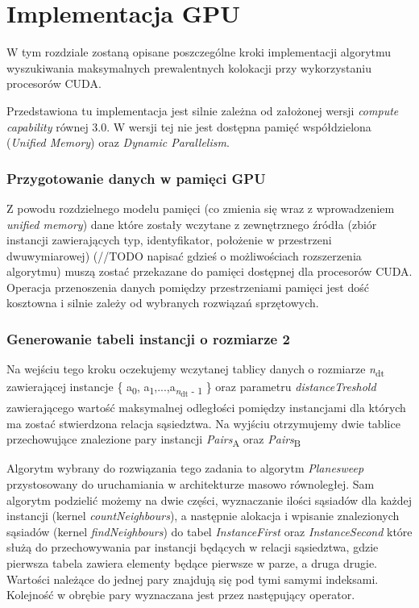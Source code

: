 \documentclass[12pt]{article}
\newcounter{operator}
\newcounter{algorytm}
\begin{document}
\section{Implementacja GPU}
\label{sec:gpu}
W tym rozdziale zostaną opisane poszczególne kroki implementacji algorytmu wyszukiwania maksymalnych prewalentnych kolokacji przy wykorzystaniu procesorów CUDA. 

Przedstawiona tu implementacja jest silnie zależna od założonej wersji \textit{compute capability} równej 3.0. W wersji tej nie jest dostępna pamięć współdzielona (\textit{Unified Memory}\cite{cuda_um}) oraz \textit{Dynamic Parallelism}\cite{cuda_dp}.

\subsubsection{Przygotowanie danych w pamięci GPU}

Z powodu rozdzielnego modelu pamięci (co zmienia się wraz z wprowadzeniem \textit{unified memory}) dane które zostały wczytane z zewnętrznego źródła (zbiór instancji zawierających typ, identyfikator, położenie w przestrzeni dwuwymiarowej) (//TODO napisać gdzieś o możliwościach rozszerzenia algorytmu) muszą zostać przekazane do pamięci dostępnej dla procesorów CUDA. Operacja przenoszenia danych pomiędzy przestrzeniami pamięci jest dość kosztowna i silnie zależy od wybranych rozwiązań sprzętowych.

\subsubsection{Generowanie tabeli instancji o rozmiarze 2}

Na wejściu tego kroku oczekujemy wczytanej tablicy danych o rozmiarze \textit{n}\textsubscript{dt} zawierającej instancje \{ a\textsubscript{0}, a\textsubscript{1},...,a\textsubscript{\textit{n}\textsubscript{dt} - 1} \} oraz parametru \textit{distanceTreshold} zawierającego wartość maksymalnej odległości pomiędzy instancjami dla których ma zostać stwierdzona relacja sąsiedztwa. Na wyjściu otrzymujemy dwie tablice przechowujące znalezione pary instancji \textit{Pairs}\textsubscript{A} oraz \textit{Pairs}\textsubscript{B}


Algorytm wybrany do rozwiązania tego zadania to algorytm \textit{Planesweep} przystosowany do uruchamiania w architekturze masowo równoległej. Sam algorytm podzielić możemy na dwie części, wyznaczanie ilości sąsiadów dla każdej instancji (kernel \textit{countNeighbours}), a następnie alokacja i wpisanie znalezionych sąsiadów (kernel \textit{findNeighbours}) do tabel \textit{InstanceFirst} oraz \textit{InstanceSecond} które służą do przechowywania par instancji będących w relacji sąsiedztwa, gdzie pierwsza tabela zawiera elementy będące pierwsze w parze, a druga drugie. Wartości należące do jednej pary znajdują się pod tymi samymi indeksami. Kolejność w obrębie pary wyznaczana jest przez następujący operator.
\end{document}
